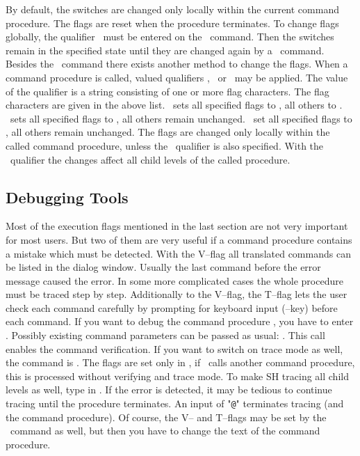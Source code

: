 By default, the switches are changed only locally within the
current command procedure.  The flags are reset when the procedure
terminates.  To change flags globally, the qualifier \
must be entered on the \ command.  Then the switches
remain in the specified state until they are changed again by a
\ command.  Besides the \ command
there exists another method
to change the flags.  When a command procedure is called, valued
qualifiers \exm{/flags}, \exm{/flags+}\ or \exm{/flags-}\ may
be applied.  The value of the qualifier is a string consisting
of one or more flag characters.  The flag characters are given
in the above list.  \ sets all specified flags to
, all others to .  \ sets all
specified flags to \exm{on}, all others remain unchanged.
\ set all specified flags to , all others
remain unchanged.  The flags are changed only locally within the
called command procedure, unless the \ qualifier
is also specified.  With the \exm{/global}\ qualifier the
changes affect all child levels of the called procedure.



\subsection{Debugging Tools}

Most of the execution flags mentioned in the last section are not
very important for most users.  But two of them are very useful
if a command procedure contains a mistake which must be
detected.  With the V--flag all translated commands can be listed
in the dialog window.  Usually the last command before the
error message caused the error.  In some more complicated cases
the whole procedure must be traced step by step.  Additionally
to the V--flag, the T--flag lets the user check each command
carefully by prompting for keyboard input (--key)
before each command.  If you want to debug the command procedure
\exm{bugproc}, you have to enter \cmd{bugproc/flags+=v}.
Possibly existing command parameters can be passed as usual:
.  This call enables the command
verification.  If you want to switch on trace mode as well, the
command is .  The flags are set only in
, if \exm{bugproc}\ calls another command procedure,
this is processed without verifying and trace mode.  To make SH
tracing all child levels as well, type in
.  If the error is detected,
it may be tedious to continue tracing until the procedure
terminates.  An input of "\verb'@'" terminates tracing (and
the command procedure).  Of course, the V-- and T--flags may
be set by the \ command as well, but then you have
to change the text of the command procedure.


